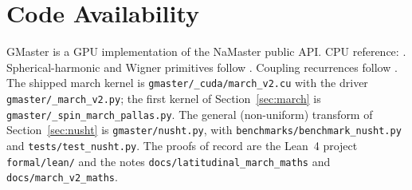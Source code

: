 \documentclass[usenatbib,useAMS]{mnras}
\begin{document}
\section*{Code Availability}

GMaster is a GPU implementation of the NaMaster public API. CPU reference: \citet{alonso2019}. Spherical-harmonic and Wigner primitives follow \citet{price2024}. Coupling recurrences follow \citet{kiddier2026}. The shipped march kernel is \texttt{gmaster/\_cuda/march\_v2.cu} with the driver \texttt{gmaster/\_march\_v2.py}; the first kernel of Section~\ref{sec:march} is \texttt{gmaster/\_spin\_march\_pallas.py}. The general (non-uniform) transform of Section~\ref{sec:nusht} is \texttt{gmaster/nusht.py}, with \texttt{benchmarks/benchmark\_nusht.py} and \texttt{tests/test\_nusht.py}. The proofs of record are the Lean~4 project \texttt{formal/lean/} and the notes \texttt{docs/latitudinal\_march\_maths} and \texttt{docs/march\_v2\_maths}.




\bsp
\label{lastpage}
\end{document}
